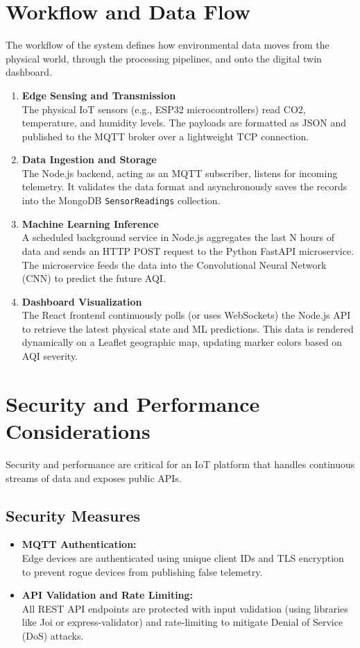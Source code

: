 \documentclass[a4paper, 12pt]{report}
\begin{document}
\section{Workflow and Data Flow}
The workflow of the system defines how environmental data moves from the physical world, through the processing pipelines, and onto the digital twin dashboard.
\begin{enumerate}
\item \textbf{Edge Sensing and Transmission}\\
The physical IoT sensors (e.g., ESP32 microcontrollers) read CO2, temperature, and humidity levels. The payloads are formatted as JSON and published to the MQTT broker over a lightweight TCP connection.
\item \textbf{Data Ingestion and Storage}\\
The Node.js backend, acting as an MQTT subscriber, listens for incoming telemetry. It validates the data format and asynchronously saves the records into the MongoDB \texttt{SensorReadings} collection.
\item \textbf{Machine Learning Inference}\\
A scheduled background service in Node.js aggregates the last N hours of data and sends an HTTP POST request to the Python FastAPI microservice. The microservice feeds the data into the Convolutional Neural Network (CNN) to predict the future AQI.
\item \textbf{Dashboard Visualization}\\
The React frontend continuously polls (or uses WebSockets) the Node.js API to retrieve the latest physical state and ML predictions. This data is rendered dynamically on a Leaflet geographic map, updating marker colors based on AQI severity.
\end{enumerate}
\section{Security and Performance Considerations}
Security and performance are critical for an IoT platform that handles continuous streams of data and exposes public APIs.
\subsection{Security Measures}
\begin{itemize}
\item \textbf{MQTT Authentication:}\\
Edge devices are authenticated using unique client IDs and TLS encryption to prevent rogue devices from publishing false telemetry.
\item \textbf{API Validation and Rate Limiting:}\\
All REST API endpoints are protected with input validation (using libraries like Joi or express-validator) and rate-limiting to mitigate Denial of Service (DoS) attacks.
\end{itemize}
\end{document}
